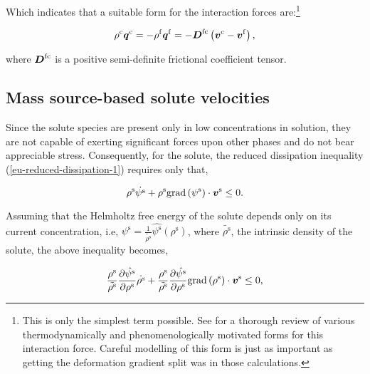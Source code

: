 \noindent Which indicates that a suitable form for the interaction
forces are:\footnote{This is only the simplest term possible. See
  for a thorough review of various thermodynamically and
  phenomenologically motivated forms for this interaction
  force. Careful modelling of this form is just as important as
  getting the deformation gradient split was in those calculations.}

\begin{equation}
\rho^{\mathrm{c}} \mbox{\boldmath$ q$}^{\mathrm{c}} 
= - \rho^{\mathrm{f}} \mbox{\boldmath$ q$}^{\mathrm{f}}
= -\mbox{\boldmath$ D$}^{\mathrm{fc}}
\left(\mbox{\boldmath$ v$}^{\mathrm{c}} - \mbox{\boldmath$ v$}^{\mathrm{f}}\right),
\label{eu-interactionforces}
\end{equation}

\noindent where  $\mbox{\boldmath$ D$}^{\mathrm{fc}}$ is a positive semi-definite
frictional coefficient tensor.


\subsection{Mass source-based solute velocities}
\label{eu-solute-velocity}

Since the solute species are present only in low concentrations in solution,
they are not capable of exerting significant forces upon other phases
and do not bear appreciable stress. Consequently, for the solute, the
reduced dissipation inequality (\ref{eu-reduced-dissipation-1})
requires only that,

\begin{equation*}
\rho^{\mathrm{s}} \dot{\psi^{\mathrm{s}}} +
\rho^{\mathrm{s}} \mathrm{grad}\left(\psi^{\mathrm{s}}\right)
\cdot\mbox{\boldmath$ v$}^{\mathrm{s}} \leq 0.
\end{equation*}

Assuming that the Helmholtz free energy of the solute depends only on
its current concentration, i.e, $\psi^{\mathrm{s}} =
\frac{1}{\tilde{\rho^{\mathrm{s}}}} \hat{\psi^{\mathrm{s}}}
(\rho^{\mathrm{s}})$, where $\tilde{\rho^{\mathrm{s}}}$, the intrinsic
density of the solute, the above inequality becomes,

\begin{equation*}
\frac{\rho^{\mathrm{s}}}{\tilde{\rho^{\mathrm{s}}}}
\frac{\partial \hat{\psi^{\mathrm{s}}}}{\partial \rho^{\mathrm{s}}}
\dot{\rho^{\mathrm{s}}}+
\frac{\rho^{\mathrm{s}}}{\tilde{\rho^{\mathrm{s}}}}
\frac{\partial \hat{\psi^{\mathrm{s}}}}{\partial \rho^{\mathrm{s}}}
\mathrm{grad}\left(\rho^{\mathrm{s}}\right) 
\cdot\mbox{\boldmath$ v$}^{\mathrm{s}}
\leq 0,
\end{equation*}

